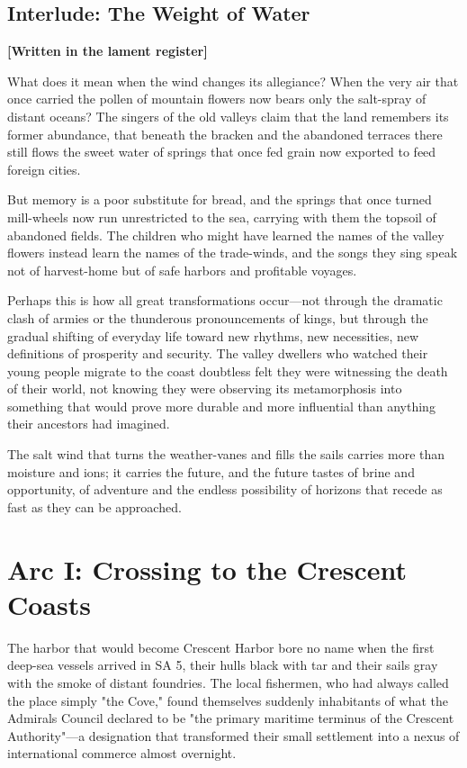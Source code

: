 \subsection{Interlude: The Weight of
Water}\label{interlude-the-weight-of-water}

\textbf{{[}Written in the lament register{]}}

What does it mean when the wind changes its allegiance? When the very
air that once carried the pollen of mountain flowers now bears only the
salt-spray of distant oceans? The singers of the old valleys claim that
the land remembers its former abundance, that beneath the bracken and
the abandoned terraces there still flows the sweet water of springs that
once fed grain now exported to feed foreign cities.

But memory is a poor substitute for bread, and the springs that once
turned mill-wheels now run unrestricted to the sea, carrying with them
the topsoil of abandoned fields. The children who might have learned the
names of the valley flowers instead learn the names of the trade-winds,
and the songs they sing speak not of harvest-home but of safe harbors
and profitable voyages.

Perhaps this is how all great transformations occur---not through the
dramatic clash of armies or the thunderous pronouncements of kings, but
through the gradual shifting of everyday life toward new rhythms, new
necessities, new definitions of prosperity and security. The valley
dwellers who watched their young people migrate to the coast doubtless
felt they were witnessing the death of their world, not knowing they
were observing its metamorphosis into something that would prove more
durable and more influential than anything their ancestors had imagined.

The salt wind that turns the weather-vanes and fills the sails carries
more than moisture and ions; it carries the future, and the future
tastes of brine and opportunity, of adventure and the endless
possibility of horizons that recede as fast as they can be approached.

\section{Arc I: Crossing to the Crescent
Coasts}\label{arc-i-crossing-to-the-crescent-coasts}

The harbor that would become Crescent Harbor bore no name when the first
deep-sea vessels arrived in SA 5, their hulls black with tar and their
sails gray with the smoke of distant foundries. The local fishermen, who
had always called the place simply "the Cove," found themselves suddenly
inhabitants of what the Admiral\textquotesingle s Council declared to be
"the primary maritime terminus of the Crescent Authority"---a
designation that transformed their small settlement into a nexus of
international commerce almost overnight.

